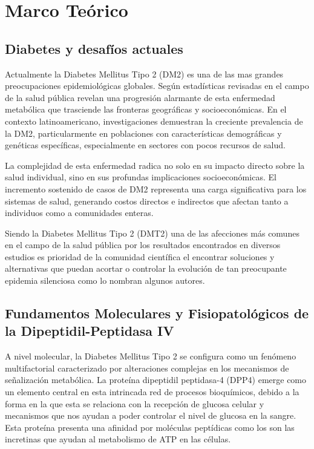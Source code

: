 \chapter{Marco Teórico}

 \section {Diabetes y desafíos actuales}
 Actualmente la Diabetes Mellitus Tipo 2 (DM2) es una de las mas grandes preocupaciones epidemiológicas globales. Según estadísticas revisadas en el campo de la salud pública revelan una progresión alarmante de esta enfermedad metabólica que trasciende las fronteras geográficas y socioeconómicas. En el contexto latinoamericano, investigaciones %
 demuestran la creciente prevalencia de la DM2, particularmente en poblaciones con características demográficas y genéticas específicas, especialmente en sectores con pocos recursos de salud.
 
 La complejidad de esta enfermedad radica no solo en su impacto directo sobre la salud individual, sino en sus profundas implicaciones socioeconómicas. El incremento sostenido de casos de DM2 representa una carga significativa para los sistemas de salud, generando costos directos e indirectos que afectan tanto a individuos como a comunidades enteras.

 Siendo la Diabetes Mellitus Tipo 2 (DMT2) una de las afecciones más comunes en el campo de la salud pública por los resultados encontrados en diversos estudios es prioridad de la comunidad científica el encontrar soluciones y alternativas que puedan acortar o controlar la evolución de tan preocupante epidemia silenciosa como lo nombran algunos autores. 

 \section {Fundamentos Moleculares y Fisiopatológicos de la Dipeptidil-Peptidasa IV}
 A nivel molecular, la Diabetes Mellitus Tipo 2 se configura como un fenómeno multifactorial caracterizado por alteraciones complejas en los mecanismos de señalización metabólica. La proteína dipeptidil peptidasa-4 (DPP4) emerge como un elemento central en esta intrincada red de procesos bioquímicos, debido a la forma en la que esta se relaciona con la recepción de glucosa celular y mecanismos que nos ayudan a poder controlar el nivel de glucosa en la sangre. Esta proteína presenta una afinidad por moléculas peptídicas como los son las incretinas que ayudan al metabolismo de ATP en las células.

